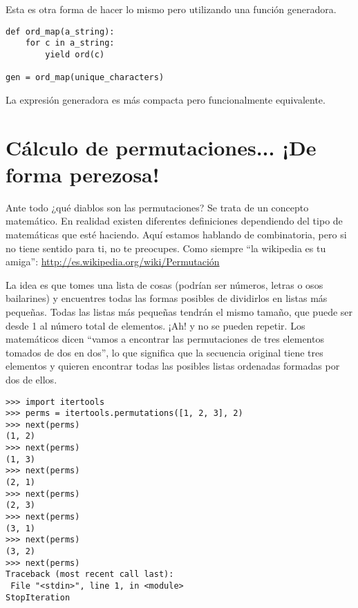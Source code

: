 Esta es otra forma de hacer lo mismo pero utilizando una función generadora.

\noindent\begin{minipage}{\textwidth}
\begin{lstlisting}[mathescape=True]
def ord_map(a_string):
    for c in a_string:
        yield ord(c)

gen = ord_map(unique_characters)
\end{lstlisting}
\end{minipage}

La expresión generadora es más compacta pero funcionalmente equivalente.

\section{Cálculo de permutaciones... ¡De forma perezosa!}

Ante todo ¿qué diablos son las permutaciones? Se trata de un concepto matemático. En realidad existen diferentes definiciones dependiendo del tipo de matemáticas que esté haciendo. Aquí estamos hablando de combinatoria, pero si no tiene sentido para ti, no te preocupes. Como siempre ``la wikipedia es tu amiga'': \href{http://es.wikipedia.org/wiki/Permutaci%C3%B3n}{http://es.wikipedia.org/wiki/Permutación}

La idea es que tomes una lista de cosas (podrían ser números, letras o osos bailarines) y encuentres todas las formas posibles de dividirlos en listas más pequeñas. Todas las listas más pequeñas tendrán el mismo tamaño, que puede ser desde 1 al número total de elementos. ¡Ah! y no se pueden repetir. Los matemáticos dicen ``vamos a encontrar las permutaciones de tres elementos tomados de dos en dos'', lo que significa que la secuencia original tiene tres elementos y quieren encontrar todas las posibles listas ordenadas formadas por dos de ellos.

\noindent\begin{minipage}{\textwidth}
\begin{lstlisting}[mathescape=True]
>>> import itertools
>>> perms = itertools.permutations([1, 2, 3], 2)
>>> next(perms)
(1, 2)
>>> next(perms)
(1, 3)
>>> next(perms)
(2, 1)
>>> next(perms)
(2, 3)
>>> next(perms)
(3, 1)
>>> next(perms)
(3, 2)
>>> next(perms)
Traceback (most recent call last):
 File "<stdin>", line 1, in <module> 
StopIteration
\end{lstlisting}
\end{minipage}


